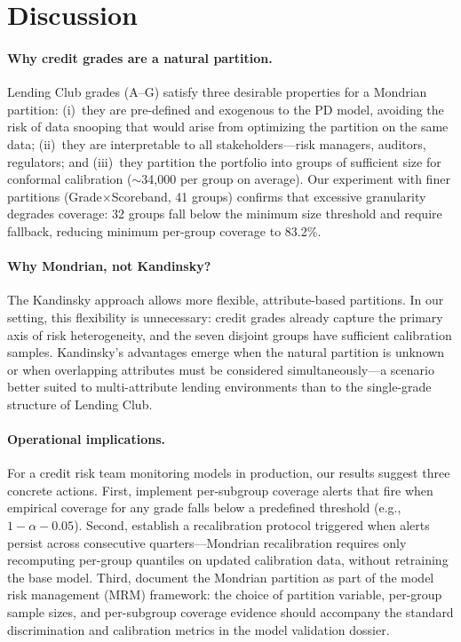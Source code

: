 \documentclass[pmlr]{jmlr}
\begin{document}
\section{Discussion}
\label{sec:discussion}

\paragraph{Why credit grades are a natural partition.}
Lending Club grades (A--G) satisfy three desirable properties for a Mondrian
partition: (i)~they are pre-defined and exogenous to the PD model, avoiding
the risk of data snooping that would arise from optimizing the partition on the
same data; (ii)~they are interpretable to all stakeholders---risk managers,
auditors, regulators; and (iii)~they partition the portfolio into groups of
sufficient size for conformal calibration ($\sim$34{,}000 per group on
average).  Our experiment with finer partitions (Grade$\times$Scoreband, 41
groups) confirms that excessive granularity degrades coverage: 32 groups fall
below the minimum size threshold and require fallback, reducing minimum
per-group coverage to 83.2\%.

\paragraph{Why Mondrian, not Kandinsky?}
The Kandinsky approach \citep{bairaktari2025} allows more flexible,
attribute-based partitions.  In our setting, this flexibility is unnecessary:
credit grades already capture the primary axis of risk heterogeneity, and the
seven disjoint groups have sufficient calibration samples.  Kandinsky's
advantages emerge when the natural partition is unknown or when overlapping
attributes must be considered simultaneously---a scenario better suited to
multi-attribute lending environments than to the single-grade structure of
Lending Club.

\paragraph{Operational implications.}
For a credit risk team monitoring models in production, our results suggest
three concrete actions.  First, implement per-subgroup coverage alerts that
fire when empirical coverage for any grade falls below a predefined threshold
(e.g., $1 - \alpha - 0.05$).  Second, establish a recalibration protocol
triggered when alerts persist across consecutive quarters---Mondrian
recalibration requires only recomputing per-group quantiles on updated
calibration data, without retraining the base model.  Third, document the
Mondrian partition as part of the model risk management (MRM) framework:
the choice of partition variable, per-group sample sizes, and per-subgroup
coverage evidence should accompany the standard discrimination and calibration
metrics in the model validation dossier.
\end{document}
